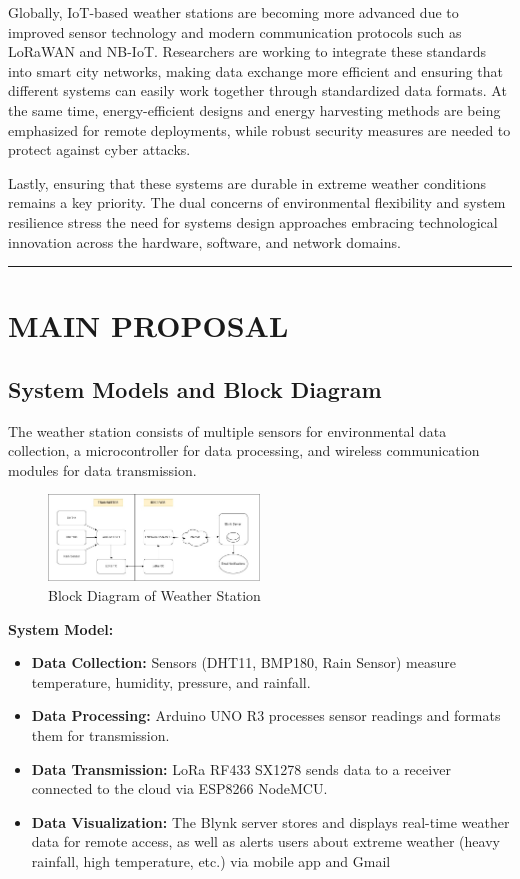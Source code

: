 \documentclass[conference, onecolumn]{IEEEtran}
\begin{document}
Globally, IoT-based weather stations are becoming more advanced due to improved sensor technology and modern communication protocols such as LoRaWAN and NB-IoT. Researchers are working to integrate these standards into smart city networks, making data exchange more efficient and ensuring that different systems can easily work together through standardized data formats. At the same time, energy-efficient designs and energy harvesting methods are being emphasized for remote deployments, while robust security measures are needed to protect against cyber attacks. 

Lastly, ensuring that these systems are durable in extreme weather conditions remains a key priority. The dual concerns of environmental flexibility and system resilience stress the need for systems design approaches embracing technological innovation across the hardware, software, and network domains.

\vspace{10pt}
\noindent\rule{\textwidth}{0.4pt}
\vspace{10pt}

\section{MAIN PROPOSAL}
\subsection{System Models and Block Diagram}
The weather station consists of multiple sensors for environmental data collection, a microcontroller for data processing, and wireless communication modules for data transmission.

\begin{figure}[H]
    \centering
    \includegraphics[width=0.5\textwidth]{figures/Weather_Station-Block_Diagram.jpg}
    \caption{Block Diagram of Weather Station}
    \label{fig:block_diagram}
\end{figure}

\textbf{System Model:}
\begin{itemize}
    \item \textbf{Data Collection:} Sensors (DHT11, BMP180, Rain Sensor) measure temperature, humidity, pressure, and rainfall.
    \item \textbf{Data Processing:} Arduino UNO R3 processes sensor readings and formats them for transmission.
    \item \textbf{Data Transmission:} LoRa RF433 SX1278 sends data to a receiver connected to the cloud via ESP8266 NodeMCU.
    \item \textbf{Data Visualization:} The Blynk server stores and displays real-time weather data for remote access, as well as alerts users about extreme weather (heavy rainfall, high temperature, etc.) via mobile app and Gmail
\end{itemize}
\end{document}
